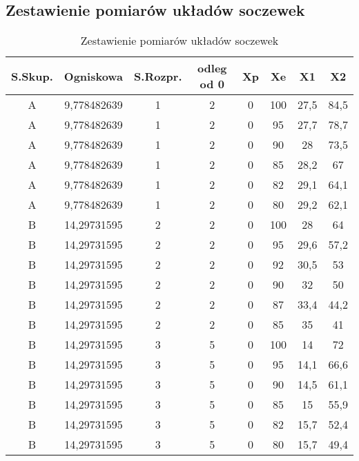 \documentclass[polish,a4paper]{article}
\begin{document}
\subsection{Zestawienie pomiarów układów soczewek}
\begin{table}[H]
\centering
\begin{tabular}{|c|c|c|c|c|c|c|c|}
\hline
S.Skup.&  Ogniskowa &  S.Rozpr. &  odleg od 0 &  Xp &  Xe &  X1 &  X2 \\
\hline
A &  9,778482639 &  1 &  2 &  0 &  100 &  27,5 &  84,5 \\
A &  9,778482639 &  1 &  2 &  0 &  95 &  27,7 &  78,7 \\
A &  9,778482639 &  1 &  2 &  0 &  90 &  28 &  73,5 \\
A &  9,778482639 &  1 &  2 &  0 &  85 &  28,2 &  67 \\
A &  9,778482639 &  1 &  2 &  0 &  82 &  29,1 &  64,1 \\
A &  9,778482639 &  1 &  2 &  0 &  80 &  29,2 &  62,1 \\
\hline
B &  14,29731595 &  2 &  2 &  0 &  100 &  28 &  64 \\
B &  14,29731595 &  2 &  2 &  0 &  95 &  29,6 &  57,2 \\
B &  14,29731595 &  2 &  2 &  0 &  92 &  30,5 &  53 \\
B &  14,29731595 &  2 &  2 &  0 &  90 &  32 &  50 \\
B &  14,29731595 &  2 &  2 &  0 &  87 &  33,4 &  44,2 \\
B &  14,29731595 &  2 &  2 &  0 &  85 &  35 &  41 \\
\hline
B &  14,29731595 &  3 &  5 &  0 &  100 &  14 &  72 \\
B &  14,29731595 &  3 &  5 &  0 &  95 &  14,1 &  66,6 \\
B &  14,29731595 &  3 &  5 &  0 &  90 &  14,5 &  61,1 \\
B &  14,29731595 &  3 &  5 &  0 &  85 &  15 &  55,9 \\
B &  14,29731595 &  3 &  5 &  0 &  82 &  15,7 &  52,4 \\
B &  14,29731595 &  3 &  5 &  0 &  80 &  15,7 &  49,4 \\
\hline
\end{tabular}
\caption{Zestawienie pomiarów układów soczewek}
\end{table}
\end{document}
